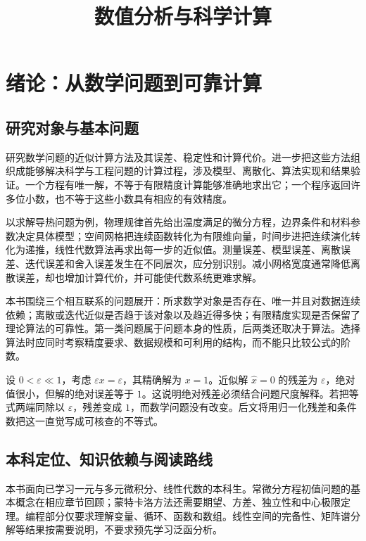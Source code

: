 \documentclass[UTF8,12pt,a4paper,fontset=fandol]{ctexbook}
\title{数值分析与科学计算}
\author{}
\date{}
\begin{document}
\maketitle
\tableofcontents

\chapter{绪论：从数学问题到可靠计算}
\label{chap:na-intro}

\section{研究对象与基本问题}
研究数学问题的近似计算方法及其误差、稳定性和计算代价。进一步把这些方法组织成能够解决科学与工程问题的计算过程，涉及模型、离散化、算法实现和结果验证。一个方程有唯一解，不等于有限精度计算能够准确地求出它；一个程序返回许多位小数，也不等于这些小数具有相应的有效精度。

以求解导热问题为例，物理规律首先给出温度满足的微分方程，边界条件和材料参数决定具体模型；空间网格把连续函数转化为有限维向量，时间步进把连续演化转化为递推，线性代数算法再求出每一步的近似值。测量误差、模型误差、离散误差、迭代误差和舍入误差发生在不同层次，应分别识别。减小网格宽度通常降低离散误差，却也增加计算代价，并可能使代数系统更难求解。

本书围绕三个相互联系的问题展开：所求数学对象是否存在、唯一并且对数据连续依赖；离散或迭代近似是否趋于该对象以及趋近得多快；有限精度实现是否保留了理论算法的可靠性。第一类问题属于问题本身的性质，后两类还取决于算法。选择算法时应同时考察精度要求、数据规模和可利用的结构，而不能只比较公式的阶数。

\begin{example}[很小的残差能说明什么]
\label{ex:na-intro-residual}
设 $0<\varepsilon\ll1$，考虑 $\varepsilon x=\varepsilon$，其精确解为 $x=1$。近似解 $\widehat x=0$ 的残差为 $\varepsilon$，绝对值很小，但解的绝对误差等于 $1$。这说明绝对残差必须结合问题尺度解释。若把等式两端同除以 $\varepsilon$，残差变成 $1$，而数学问题没有改变。后文将用归一化残差和条件数把这一直觉写成可核查的不等式。
\end{example}

\section{本科定位、知识依赖与阅读路线}
本书面向已学习一元与多元微积分、线性代数的本科生。常微分方程初值问题的基本概念在相应章节回顾；蒙特卡洛方法还需要期望、方差、独立性和中心极限定理。编程部分仅要求理解变量、循环、函数和数组。线性空间的完备性、矩阵谱分解等结果按需要说明，不要求预先学习泛函分析。
\end{document}
